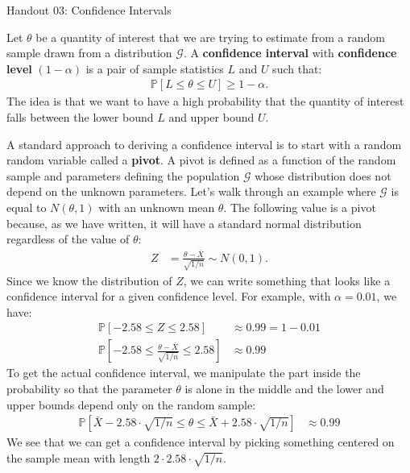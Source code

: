 \documentclass{tufte-handout}
\newcommand{\Prob}{\mathbb{P}}
\begin{document}
\justify

{\LARGE Handout 03: Confidence Intervals}

\vspace*{18pt}

\noindent
Let $\theta$ be a quantity of interest that we are trying to estimate from a
random sample drawn from a distribution $\mathcal{G}$. A \textbf{confidence interval}
with \textbf{confidence level} $(1-\alpha)$ is a pair of sample statistics
$L$ and $U$ such that:
\begin{align*}
\Prob\left[ L \leq \theta \leq U \right] \geq 1 - \alpha.
\end{align*}
The idea is that we want to have a high probability that the quantity of interest
falls between the lower bound $L$ and upper bound $U$.

A standard approach to deriving a confidence interval is to start with a random
random variable called a \textbf{pivot}. A pivot is defined as a function of the
random sample and parameters defining the population $\mathcal{G}$ whose distribution
does not depend on the unknown parameters. Let's walk through an example where $\mathcal{G}$
is equal to $N(\theta, 1)$ with an unknown mean $\theta$. The following value is a
pivot because, as we have written, it will have a standard normal distribution regardless
of the value of $\theta$:
\begin{align*}
Z &= \frac{\theta - \bar{X}}{\sqrt{1/n}} \sim N(0, 1).
\end{align*}
Since we know the distribution of $Z$, we can write something that looks like 
a confidence interval for a given confidence level. For example, with $\alpha = 0.01$,
we have:
\begin{align*}
\Prob\left[ -2.58 \leq Z \leq 2.58 \right] &\approx 0.99 = 1 - 0.01 \\
\Prob\left[ -2.58 \leq \frac{\theta - \bar{X}}{\sqrt{1/n}} \leq 2.58 \right] &\approx 0.99
\end{align*}
To get the actual confidence interval, we manipulate the part inside the probability
so that the parameter $\theta$ is alone in the middle and the lower and upper bounds
depend only on the random sample:
\begin{align*}
\Prob\left[ \bar{X} - 2.58 \cdot \sqrt{1/n} \leq \theta \leq \bar{X} + 2.58 \cdot \sqrt{1/n} \right] &\approx 0.99
\end{align*}
We see that we can get a confidence interval by picking something centered on the sample
mean with length $2 \cdot 2.58 \cdot \sqrt{1/n}$.
\end{document}
